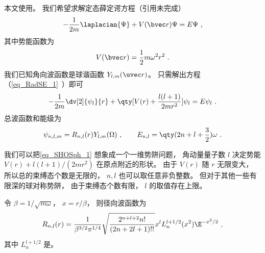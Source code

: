
\begin{issues}
\issueDraft
\end{issues}


本文使用。 我们希望求解定态薛定谔方程（引用未完成）
\begin{equation}
-\frac{1}{2m} \laplacian {\Psi} + V(\bvec r)\Psi = E \Psi~,
\end{equation}
其中势能函数为
\begin{equation}
V(\bvec r) = \frac{1}{2}m\omega^2 r^2~.
\end{equation}
我们已知角向波函数是球谐函数 $Y_{l,m}(\uvec r)$。 只需解出方程（\autoref{eq_RadSE_1}~）即可
\begin{equation}\label{eq_SHOSph_1}
-\frac{1}{2m} \dv[2]{\psi_l}{r} + \qty[V(r) + \frac{l(l + 1)}{2mr^2}]\psi_l = E\psi_l~.
\end{equation}
总波函数和能级为
\begin{equation}
\psi_{n,l,m} = R_{n,l}(r) Y_{l,m}(\Omega)~,
\qquad
E_{n,l} = \qty(2n + l + \frac32) \omega~.
\end{equation}    

我们可以把\autoref{eq_SHOSph_1} 想象成一个一维势阱问题， 角动量量子数 $l$ 决定势能 $V(r) + l(l + 1)/(2mr^2)$ 在原点附近的形状。 由于 $V(r)$ 随 $r$ 无限变大， 所以总的束缚态个数是无限的， $n, l$ 也可以取任意非负整数。 但对于其他一些有限深的球对称势阱， 由于束缚态个数有限， $l$ 的取值存在上限。

令 $\beta = 1/\sqrt{m\omega}$， $x = r/\beta$， 则径向波函数为
\begin{equation}
R_{n,l}(r) = \frac{1}{\beta^{3/2} \pi^{1/4}} \sqrt{\frac{2^{n+l+2} n!}{(2n + 2l + 1)!!}} x^l L_n^{l+1/2}(x^2) \E^{-x^2/2}~,
\end{equation}
其中 $L_n^{l+1/2}$ 是。

